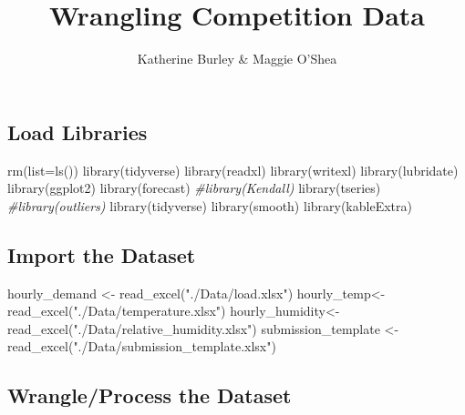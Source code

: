 \documentclass[
]{article}
\title{Wrangling Competition Data}
\author{Katherine Burley \& Maggie O'Shea}
\date{}
\newenvironment{Shaded}{\begin{snugshade}}{\end{snugshade}}
\newcommand{\AttributeTok}[1]{\textcolor[rgb]{0.77,0.63,0.00}{#1}}
\newcommand{\CommentTok}[1]{\textcolor[rgb]{0.56,0.35,0.01}{\textit{#1}}}
\newcommand{\FunctionTok}[1]{\textcolor[rgb]{0.00,0.00,0.00}{#1}}
\newcommand{\NormalTok}[1]{#1}
\newcommand{\OtherTok}[1]{\textcolor[rgb]{0.56,0.35,0.01}{#1}}
\newcommand{\StringTok}[1]{\textcolor[rgb]{0.31,0.60,0.02}{#1}}
\begin{document}
\maketitle

\hypertarget{load-libraries}{%
\subsection{Load Libraries}\label{load-libraries}}

\begin{Shaded}
\begin{Highlighting}[]
\FunctionTok{rm}\NormalTok{(}\AttributeTok{list=}\FunctionTok{ls}\NormalTok{())}
\FunctionTok{library}\NormalTok{(tidyverse)}
\FunctionTok{library}\NormalTok{(readxl)}
\FunctionTok{library}\NormalTok{(writexl)}
\FunctionTok{library}\NormalTok{(lubridate)}
\FunctionTok{library}\NormalTok{(ggplot2)}
\FunctionTok{library}\NormalTok{(forecast)  }
\CommentTok{\#library(Kendall)}
\FunctionTok{library}\NormalTok{(tseries)}
\CommentTok{\#library(outliers)}
\FunctionTok{library}\NormalTok{(tidyverse)}
\FunctionTok{library}\NormalTok{(smooth)}
\FunctionTok{library}\NormalTok{(kableExtra)}
\end{Highlighting}
\end{Shaded}

\hypertarget{import-the-dataset}{%
\subsection{Import the Dataset}\label{import-the-dataset}}

\begin{Shaded}
\begin{Highlighting}[]
\NormalTok{hourly\_demand }\OtherTok{\textless{}{-}} \FunctionTok{read\_excel}\NormalTok{(}\StringTok{"./Data/load.xlsx"}\NormalTok{)}
\NormalTok{hourly\_temp}\OtherTok{\textless{}{-}} \FunctionTok{read\_excel}\NormalTok{(}\StringTok{"./Data/temperature.xlsx"}\NormalTok{)}
\NormalTok{hourly\_humidity}\OtherTok{\textless{}{-}} \FunctionTok{read\_excel}\NormalTok{(}\StringTok{"./Data/relative\_humidity.xlsx"}\NormalTok{)}
\NormalTok{submission\_template }\OtherTok{\textless{}{-}} \FunctionTok{read\_excel}\NormalTok{(}\StringTok{"./Data/submission\_template.xlsx"}\NormalTok{)}
\end{Highlighting}
\end{Shaded}

\hypertarget{wrangleprocess-the-dataset}{%
\subsection{Wrangle/Process the
Dataset}\label{wrangleprocess-the-dataset}}
\end{document}
